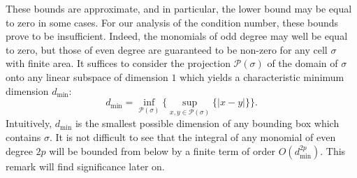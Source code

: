 These bounds are approximate, and in particular, the lower bound may be equal to zero in some cases. For our analysis of the condition number, these bounds prove to be insufficient. Indeed, the monomials of odd degree may well be equal to zero, but those of even degree are guaranteed to be non-zero for any cell $\sigma$ with finite area. It suffices to consider the projection $\mathcal{P} (\sigma)$ of the domain of $\sigma$ onto any linear subspace of dimension $1$ which yields a characteristic minimum dimension $d_{\min}$:
\begin{equation}
	d_{\min} = \inf_{\mathcal{P} (\sigma)} \{ \sup_{x, y \in \mathcal{P} (\sigma)} \{ | x - y | \} \}.
\end{equation}
Intuitively, $d_{\min}$ is the smallest possible dimension of any bounding box which contains $\sigma$. It is not difficult to see that the integral of any monomial of even degree $2p$ will be bounded from below by a finite term of order $O(d_{\min}^{2p})$. This remark will find significance later on.

